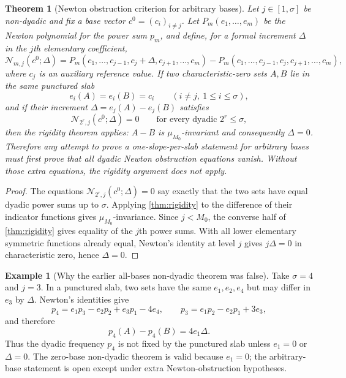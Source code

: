 \documentclass[11pt]{article}
\newtheorem{theorem}{Theorem}[section]
\theoremstyle{definition}
\newtheorem{example}[example]{Example}
\newcommand{\calN}{\mathcal N}
\begin{document}
\begin{theorem}[Newton obstruction criterion for arbitrary bases]\label{thm:allbasesdir}
Let $j\in[1,\sigma]$ be non-dyadic and fix a base vector $c^0=(c_i)_{i\ne j}$.  Let $P_m(e_1,\dots,e_m)$ be the Newton polynomial for the power sum $p_m$, and define, for a formal increment $\Delta$ in the $j$th elementary coefficient,
\[
        \calN_{m,j}(c^0;\Delta)
        =P_m(c_1,\dots,c_{j-1},c_j+\Delta,c_{j+1},\dots,c_m)
         -P_m(c_1,\dots,c_{j-1},c_j,c_{j+1},\dots,c_m),
\]
where $c_j$ is an auxiliary reference value.  If two characteristic-zero sets $A,B$ lie in the same punctured slab
\[
        e_i(A)=e_i(B)=c_i\qquad (i\ne j,\ 1\le i\le\sigma),
\]
and if their increment $\Delta=e_j(A)-e_j(B)$ satisfies
\[
        \calN_{2^r,j}(c^0;\Delta)=0\qquad\text{for every dyadic }2^r\le\sigma,
\]
then the rigidity theorem applies: $A-B$ is $\mu_{M_0}$-invariant and consequently $\Delta=0$.  Therefore any attempt to prove a one-slope-per-slab statement for arbitrary bases must first prove that all dyadic Newton obstruction equations vanish.  Without those extra equations, the rigidity argument does not apply.
\end{theorem}

\begin{proof}
The equations $\calN_{2^r,j}(c^0;\Delta)=0$ say exactly that the two sets have equal dyadic power sums up to $\sigma$.  Applying \cref{thm:rigidity} to the difference of their indicator functions gives $\mu_{M_0}$-invariance.  Since $j<M_0$, the converse half of \cref{thm:rigidity} gives equality of the $j$th power sums.  With all lower elementary symmetric functions already equal, Newton's identity at level $j$ gives $j\Delta=0$ in characteristic zero, hence $\Delta=0$.
\end{proof}

\begin{example}[Why the earlier all-bases non-dyadic theorem was false]\label{ex:falseallbasesdir}
Take $\sigma=4$ and $j=3$.  In a punctured slab, two sets have the same $e_1,e_2,e_4$ but may differ in $e_3$ by $\Delta$.  Newton's identities give
\[
        p_4=e_1p_3-e_2p_2+e_3p_1-4e_4,
        \qquad
        p_3=e_1p_2-e_2p_1+3e_3,
\]
and therefore
\[
        p_4(A)-p_4(B)=4e_1\Delta.
\]
Thus the dyadic frequency $p_4$ is not fixed by the punctured slab unless $e_1=0$ or $\Delta=0$.  The zero-base non-dyadic theorem is valid because $e_1=0$; the arbitrary-base statement is open except under extra Newton-obstruction hypotheses.
\end{example}
\end{document}
